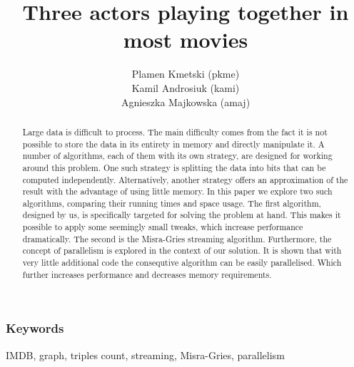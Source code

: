\documentclass[11pt]{article} %
\title{Three actors playing together in most movies}
\author{Plamen Kmetski (pkme)\\Kamil Androsiuk (kami)\\Agnieszka Majkowska (amaj)}
\begin{document}
\maketitle

\begin{abstract}

Large data is difficult to process. The main difficulty comes from the fact it is not possible to store the data in its entirety in memory and directly manipulate it. A number of algorithms, each of them with its own strategy, are designed for working around this problem. One such strategy is splitting the data into bits that can be computed independently. Alternatively, another strategy offers an approximation of the result with the advantage of using little memory. In this paper we explore two such algorithms, comparing their running times and space usage. The first algorithm, designed by us, is specifically targeted for solving the problem at hand. This makes it possible to apply some seemingly small tweaks, which increase performance dramatically. The second is the Misra-Gries streaming algorithm. Furthermore, the concept of parallelism is explored in the context of our solution. It is shown that with very little additional code the consequtive algorithm can be easily parallelised. Which further increases performance and decreases memory requirements.

\end{abstract}

\subsubsection*{Keywords}
\label{Keywords}
IMDB, graph, triples count, streaming, Misra-Gries, parallelism








\end{document}
